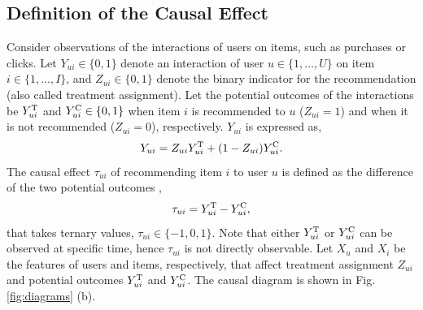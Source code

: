 \documentclass[manuscript,screen]{acmart}
\begin{document}
\subsection{Definition of the Causal Effect}
Consider observations of the interactions of users on items, such as purchases or clicks.
Let $Y_{ui} \in \{0, 1\}$ denote an interaction of user $u \in \{1,...,U\}$ on item $i \in \{1,...,I\}$, and $Z_{ui} \in \{0, 1\}$ denote the binary indicator for the recommendation (also called treatment assignment).
Let the potential outcomes of the interactions be $Y_{ui}^\textnormal{T}$ and $Y_{ui}^\textnormal{C} \in \{0, 1\}$ when item $i$ is recommended to $u$ ($Z_{ui} = 1$) and when it is not recommended ($Z_{ui} = 0$), respectively.
$Y_{ui}$ is expressed as,
\begin{equation}
\label{eq:observed_outcome}
Y_{ui} = Z_{ui} Y_{ui}^\textnormal{T} + (1-Z_{ui}) Y_{ui}^\textnormal{C}.
\end{equation}
The causal effect $\tau_{ui}$ of recommending item $i$ to user $u$ is defined as the difference of the two potential outcomes \cite{Rubin74},
\begin{equation}
\tau_{ui} = Y_{ui}^\textnormal{T} - Y_{ui}^\textnormal{C},
\end{equation}
that takes ternary values, $\tau_{ui} \in \{-1, 0, 1\}$.
Note that either $Y_{ui}^\textnormal{T}$ or $Y_{ui}^\textnormal{C}$ can be observed at specific time, hence $\tau_{ui}$ is not directly observable.
Let $X_u$ and $X_i$ be the features of users and items, respectively, that affect treatment assignment $Z_{ui}$ and potential outcomes $Y_{ui}^\textnormal{T}$ and $Y_{ui}^\textnormal{C}$.
The causal diagram is shown in Fig. \ref{fig:diagrams} (b).
\end{document}
